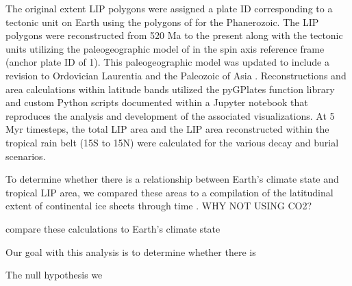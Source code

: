 \documentclass[11pt,letterpaper]{article}
\begin{document}
The original extent LIP polygons were assigned a plate ID corresponding to a tectonic unit on Earth using the polygons of \cite{Torsvik2016a} for the Phanerozoic. The LIP polygons were reconstructed from 520 Ma to the present along with the tectonic units utilizing the paleogeographic model of \cite{Torsvik2016a} in the spin axis reference frame (anchor plate ID of 1). This paleogeographic model was updated to include a revision to Ordovician Laurentia \citep{Swanson-Hysell2017a} and the Paleozoic of Asia \citep{Domeier2018a}. Reconstructions and area calculations within latitude bands utilized the pyGPlates function library and custom Python scripts documented within a Jupyter notebook that reproduces the analysis and development of the associated visualizations. At 5 Myr timesteps, the total LIP area and the LIP area reconstructed within the tropical rain belt (15\textdegree S to 15\textdegree N) were calculated for the various decay and burial scenarios. 

To determine whether there is a relationship between Earth's climate state and tropical LIP area, we compared these areas to a compilation of the latitudinal extent of continental ice sheets through time \fig{}. WHY NOT USING CO2?

compare these calculations to Earth's climate state 



Our goal with this analysis is to determine whether there is 

The null hypothesis we 
\end{document}
